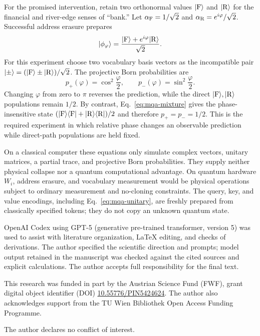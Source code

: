 \documentclass[
  aps,
  reprint,
  superscriptaddress,
  floatfix,
  nofootinbib,
  longbibliography
]{revtex4-2}
\begin{document}
For the promised intervention, retain two orthonormal values
$|{\rm F}\rangle$ and $|{\rm R}\rangle$ for the financial and river-edge
senses of ``bank.''  Let
$\alpha_{\rm F}=1/\sqrt2$ and
$\alpha_{\rm R}=e^{i\varphi}/\sqrt2$.  Successful address erasure prepares
\begin{equation}
 |\phi_\varphi\rangle
 =\frac{|{\rm F}\rangle+e^{i\varphi}|{\rm R}\rangle}{\sqrt2}.
\label{eq:mqa-bank-state}
\end{equation}
For this experiment choose two vocabulary basis vectors as the incompatible
pair $|\mathord{\pm}\rangle=(|{\rm F}\rangle\pm|{\rm R}\rangle)/\sqrt2$.
The projective Born probabilities are
\begin{equation}
 p_+(\varphi)=\cos^2\frac{\varphi}{2},\qquad
 p_-(\varphi)=\sin^2\frac{\varphi}{2}.
\label{eq:mqa-bank-fringe}
\end{equation}
Changing $\varphi$ from zero to $\pi$ reverses the prediction, while the
direct $|{\rm F}\rangle,|{\rm R}\rangle$ populations remain $1/2$.  By
contrast, Eq.~\eqref{eq:mqa-mixture} gives the phase-insensitive state
$(|{\rm F}\rangle\langle{\rm F}|
 +|{\rm R}\rangle\langle{\rm R}|)/2$ and therefore $p_+=p_-=1/2$.
This is the required experiment in which relative phase changes an observable
prediction while direct-path populations are held fixed.

On a classical computer these equations only simulate complex vectors,
unitary matrices, a partial trace, and projective Born probabilities.  They
supply neither physical collapse nor a quantum computational advantage.  On
quantum hardware $W_i$, address erasure, and vocabulary measurement would be
physical operations subject to ordinary measurement and no-cloning
constraints.  The query, key, and value encodings, including
Eq.~\eqref{eq:mqa-unitary}, are freshly prepared from classically specified
tokens; they do not copy an unknown quantum state.


\begin{acknowledgments}
OpenAI Codex using GPT-5 (generative pre-trained transformer, version 5) was
used to assist with literature organization, \LaTeX{}
editing, and checks of derivations.  The author specified the scientific
direction and prompts; model output retained in the manuscript was checked
against the cited sources and explicit calculations.  The author accepts full
responsibility for the final text.

This research was funded in part by the Austrian Science Fund (FWF), grant
digital object identifier (DOI)
\href{https://doi.org/10.55776/PIN5424624}{10.55776/PIN5424624}.
The author also acknowledges support from the TU Wien Bibliothek Open Access
Funding Programme.

The author declares no conflict of interest.
\end{acknowledgments}


\end{document}

